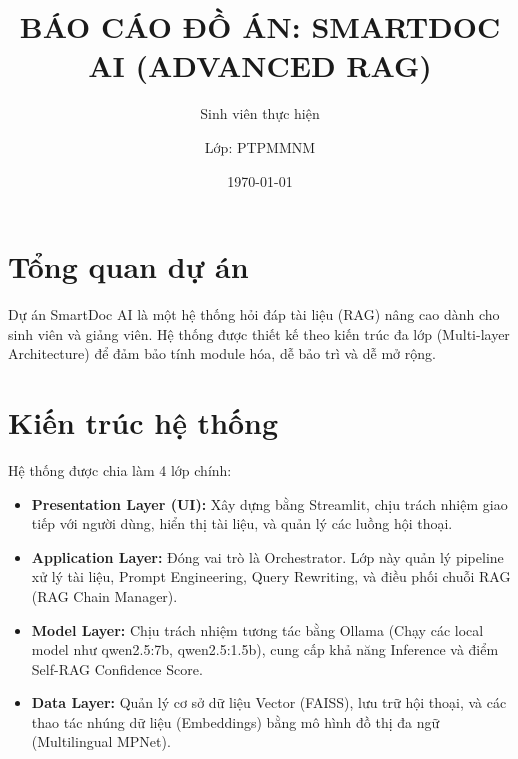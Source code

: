 \documentclass[12pt,a4paper]{article}
\title{BÁO CÁO ĐỒ ÁN: SMARTDOC AI (ADVANCED RAG)}
\author{Sinh viên thực hiện \and Lớp: PTPMMNM}
\date{\today}
\begin{document}
\maketitle

\section{Tổng quan dự án}
Dự án SmartDoc AI là một hệ thống hỏi đáp tài liệu (RAG) nâng cao dành cho sinh viên và giảng viên. Hệ thống được thiết kế theo kiến trúc đa lớp (Multi-layer Architecture) để đảm bảo tính module hóa, dễ bảo trì và dễ mở rộng.

\section{Kiến trúc hệ thống}
Hệ thống được chia làm 4 lớp chính:
\begin{itemize}
    \item \textbf{Presentation Layer (UI):} Xây dựng bằng Streamlit, chịu trách nhiệm giao tiếp với người dùng, hiển thị tài liệu, và quản lý các luồng hội thoại.
    \item \textbf{Application Layer:} Đóng vai trò là Orchestrator. Lớp này quản lý pipeline xử lý tài liệu, Prompt Engineering, Query Rewriting, và điều phối chuỗi RAG (RAG Chain Manager).
    \item \textbf{Model Layer:} Chịu trách nhiệm tương tác bằng Ollama (Chạy các local model như qwen2.5:7b, qwen2.5:1.5b), cung cấp khả năng Inference và điểm Self-RAG Confidence Score.
    \item \textbf{Data Layer:} Quản lý cơ sở dữ liệu Vector (FAISS), lưu trữ hội thoại, và các thao tác nhúng dữ liệu (Embeddings) bằng mô hình đồ thị đa ngữ (Multilingual MPNet).
\end{itemize}
\end{document}
